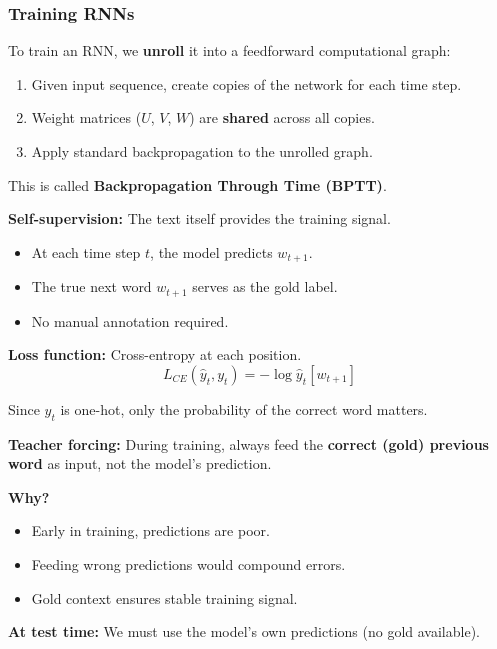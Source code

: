\subsubsection{Training RNNs}

\begin{defbox}
To train an RNN, we \textbf{unroll} it into a feedforward computational graph:
\begin{enumerate}
  \item Given input sequence, create copies of the network for each time step.
  \item Weight matrices ($U$, $V$, $W$) are \textbf{shared} across all copies.
  \item Apply standard backpropagation to the unrolled graph.
\end{enumerate}

This is called \textbf{Backpropagation Through Time (BPTT)}.
\end{defbox}

\begin{defbox}
\textbf{Self-supervision:} The text itself provides the training signal.
\begin{itemize}
  \item At each time step $t$, the model predicts $w_{t+1}$.
  \item The true next word $w_{t+1}$ serves as the gold label.
  \item No manual annotation required.
\end{itemize}

\textbf{Loss function:} Cross-entropy at each position.
\[
L_{CE}(\hat{y}_t, y_t) = -\log \hat{y}_t[w_{t+1}]
\]

Since $y_t$ is one-hot, only the probability of the correct word matters.
\end{defbox}

\begin{defbox}
\textbf{Teacher forcing:} During training, always feed the \textbf{correct (gold) previous word} as input, not the model's prediction.

\textbf{Why?}
\begin{itemize}
  \item Early in training, predictions are poor.
  \item Feeding wrong predictions would compound errors.
  \item Gold context ensures stable training signal.
\end{itemize}

\textbf{At test time:} We must use the model's own predictions (no gold available).
\end{defbox}

